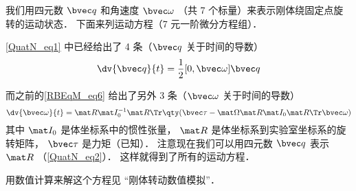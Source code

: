 

我们用四元数 $\bvec q$ 和角速度 $\bvec \omega$ （共 7 个标量）来表示刚体绕固定点旋转的运动状态． 下面来列运动方程（7 元一阶微分方程组）．

\autoref{QuatN_eq1} 中已经给出了 4 条（$\bvec q$ 关于时间的导数）
\begin{equation}
\dv{\bvec q}{t} = \frac12 [0, \bvec \omega] \bvec q
\end{equation}

而之前的\autoref{RBEqM_eq6} 给出了另外 3 条（$\bvec\omega$ 关于时间的导数）
\begin{equation}
\dv{\bvec \omega}{t} = \mat R \mat I_0^{-1} \mat R\Tr \qty(\bvec \tau  - \mat \Omega \mat R \mat I_0 \mat R\Tr \bvec\omega)
\end{equation}
其中 $\mat I_0$ 是体坐标系中的惯性张量， $\mat R$ 是体坐标系到实验室坐标系的旋转矩阵， $\bvec\tau$ 是力矩（已知）． 注意现在我们可以用四元数 $\bvec q$ 表示 $\mat R$ （\autoref{QuatN_eq2}）． 这样就得到了所有的运动方程．

用数值计算来解这个方程见 “刚体转动数值模拟”．
